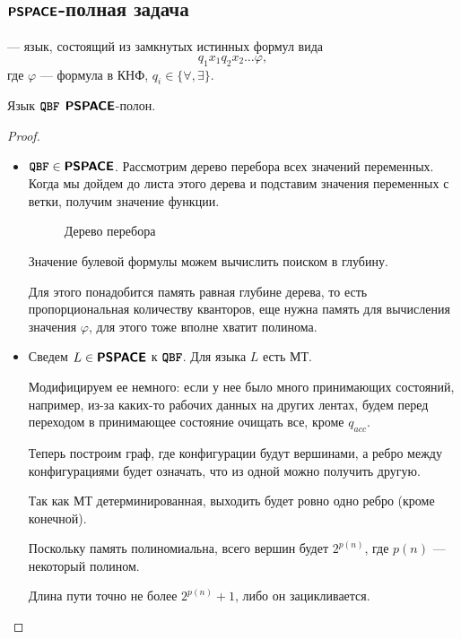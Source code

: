 \subsection{$ \textmd{\textbf{\textsf{PSPACE}}}$-полная задача}
\begin{defn}\index{\QBF}
	 --- язык, состоящий из замкнутых истинных формул вида \[
	q_1 x_1 q_2 x_2 \ldots \varphi 
	,\]    
	где $ \varphi $ --- формула в КНФ, $ q_i \in \{ \forall , \exists \}$.
\end{defn}
\begin{thm}
	Язык $ {{\textbf{\texttt{QBF}}}}$ $ \textmd{\textbf{\textsf{PSPACE}}} $-полон.
\end{thm}
\begin{proof}
	\begin{itemize}
		\item $ {{\textbf{\texttt{QBF}}}} \in \textmd{\textbf{\textsf{PSPACE}}}$. Рассмотрим дерево перебора всех значений переменных. Когда мы дойдем до листа этого дерева и подставим значения переменных с ветки, получим значение функции.
	\begin{figure}[ht]
		\centering
		\caption{Дерево перебора}
		\label{fig:qbf-tree}
	\end{figure}
	Значение булевой формулы можем вычислить поиском в глубину.
	
	Для этого понадобится память равная глубине дерева, то есть пропорциональная количеству кванторов, еще нужна память для вычисления значения $ \varphi $, для этого тоже вполне хватит полинома.
	
    \item Сведем $ L \in \textmd{\textbf{\textsf{PSPACE}}}$ к $ {{\textbf{\texttt{QBF}}}}$. Для языка  $ L$ есть МТ. 
    
    Модифицируем ее немного: если у нее было много принимающих состояний, например, из-за каких-то рабочих данных на других лентах, будем перед переходом в принимающее состояние очищать все, кроме $ q_{acc}$.

	Теперь построим граф, где конфигурации будут вершинами, а ребро между конфигурациями будет означать, что из одной можно получить другую.

	Так как МТ детерминированная, выходить будет ровно одно ребро (кроме конечной).

	Поскольку память полиномиальна, всего вершин будет $ 2^{p(n)}$, где $ p(n)$ --- некоторый полином.

	Длина пути точно не более $ 2^{p(n)}+1$, либо он зацикливается.


\end{itemize}
\end{proof}
